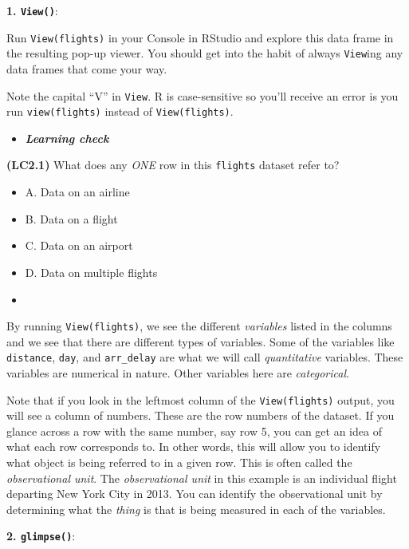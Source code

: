 \documentclass[12pt,]{krantz}
\providecommand{\tightlist}{%
  \setlength{\itemsep}{0pt}\setlength{\parskip}{0pt}}
\newenvironment{rmdblock}[1]
  {\begin{shaded*}
  \begin{itemize}
  \renewcommand{\labelitemi}{
    \raisebox{-.7\height}[0pt][0pt]{
    }
  }
  \item
  }
  {
  \end{itemize}
  \end{shaded*}
  }
\newenvironment{learncheck}
  {\begin{rmdblock}{warning}}
  {\end{rmdblock}}
\begin{document}
\textbf{1. \texttt{View()}}:

Run \texttt{View(flights)} in your Console in RStudio and explore this
data frame in the resulting pop-up viewer. You should get into the habit
of always \texttt{View}ing any data frames that come your way.

Note the capital ``V'' in \texttt{View}. R is case-sensitive so you'll
receive an error is you run \texttt{view(flights)} instead of
\texttt{View(flights)}.

\begin{learncheck}
\textbf{\emph{Learning check}}
\end{learncheck}

\textbf{(LC2.1)} What does any \emph{ONE} row in this \texttt{flights}
dataset refer to?

\begin{itemize}
\tightlist
\item
  A. Data on an airline
\item
  B. Data on a flight
\item
  C. Data on an airport
\item
  D. Data on multiple flights
\end{itemize}

\begin{learncheck}

\end{learncheck}

By running \texttt{View(flights)}, we see the different \emph{variables}
listed in the columns and we see that there are different types of
variables. Some of the variables like \texttt{distance}, \texttt{day},
and \texttt{arr\_delay} are what we will call \emph{quantitative}
variables. These variables are numerical in nature. Other variables here
are \emph{categorical}.

Note that if you look in the leftmost column of the
\texttt{View(flights)} output, you will see a column of numbers. These
are the row numbers of the dataset. If you glance across a row with the
same number, say row 5, you can get an idea of what each row corresponds
to. In other words, this will allow you to identify what object is being
referred to in a given row. This is often called the \emph{observational
unit}. The \emph{observational unit} in this example is an individual
flight departing New York City in 2013. You can identify the
observational unit by determining what the \emph{thing} is that is being
measured in each of the variables.

\textbf{2. \texttt{glimpse()}}:
\end{document}
